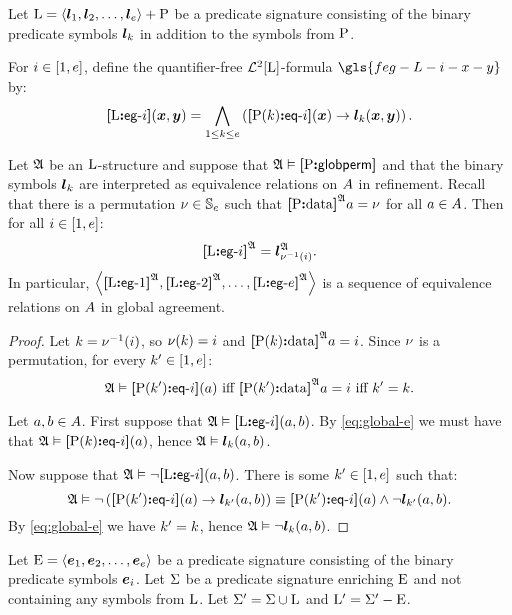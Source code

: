 Let ${\mathrm{L}} = \left\langle \bm{l}_{1}, \bm{l}_{2}, \dots, \bm{l}_{e} \right\rangle + {\mathrm{P}}$ be a predicate
signature consisting of the binary predicate symbols $\bm{l}_{k}$ in addition to
the symbols from ${\mathrm{P}}$.

\begin{definition}
For $i \in [1, e]$, define the quantifier-free $\mathcal{L}^{2}[{\mathrm{L}}]$-formula
$\gls{feg-L-i-x-y}$ by:
\[
  {\bm{[}{\mathrm{L}}\mathord{\bm{:}}\mathsf{eg}{\hbox{-}}i\bm{]}}(\bm{x},\bm{y}) = \bigwedge_{1 \leq k \leq e}
  \left({\bm{[}{\mathrm{P}}(k)\mathord{\bm{:}}\mathsf{eq}{\hbox{-}}i\bm{]}}(\bm{x}) \rightarrow \bm{l}_{k}(\bm{x}, \bm{y})\right).
\]
\end{definition}
\begin{remark}\label{rem:global-e-m}
Let $\mathfrak{A}$ be an ${\mathrm{L}}$-structure and suppose that 
$\mathfrak{A} \vDash {\bm{[}{\mathrm{P}}\mathord{\bm{:}}\mathsf{globperm}\bm{]}}$
and that the binary symbols $\bm{l}_{k}$ are interpreted as equivalence relations
on $A$ in refinement.
Recall that there is a permutation $\nu \in \mathbb{S}_{e}$ such that
${\bm{[}{\mathrm{P}}\mathord{\bm{:}}\mathrm{data}\bm{]}}^{\mathfrak{A}}a =\nu$ for all $a \in A$.
Then for all $i \in [1, e]$:
\[
  {\bm{[}{\mathrm{L}}\mathord{\bm{:}}\mathsf{eg}{\hbox{-}}i\bm{]}}^{\mathfrak{A}} = \bm{l}_{\nu^{-1}(i)}^{\mathfrak{A}}.
\]
In particular,
$\left\langle {\bm{[}{\mathrm{L}}\mathord{\bm{:}}\mathsf{eg}{\hbox{-}}1\bm{]}}^{\mathfrak{A}}, {\bm{[}{\mathrm{L}}\mathord{\bm{:}}\mathsf{eg}{\hbox{-}}2\bm{]}}^{\mathfrak{A}}, \dots, {\bm{[}{\mathrm{L}}\mathord{\bm{:}}\mathsf{eg}{\hbox{-}}e\bm{]}}^{\mathfrak{A}} \right\rangle$ is
a sequence of equivalence relations on $A$ in global agreement.
\end{remark}
\begin{proof}
Let $k = \nu^{-1}(i)$, so $\nu(k) = i$ and
${\bm{[}{\mathrm{P}}(k)\mathord{\bm{:}}\mathrm{data}\bm{]}}^{\mathfrak{A}}a = i$.
Since $\nu$ is a permutation, for every ${k'} \in [1, e]$:
\begin{equation}\label{eq:global-e}
\mifff{ 
  \StrA \vDash \feqA{\PS(\kkp)}\ii(\ea)}{
  \data{\PSp\kkp}\StrA\ea = \ii}{
  \kkp = \kk}.
\end{equation}

Let $a, b \in A$.
First suppose that $\mathfrak{A} \vDash {\bm{[}{\mathrm{L}}\mathord{\bm{:}}\mathsf{eg}{\hbox{-}}i\bm{]}}(a,b)$.
By \cref{eq:global-e} we must have that ${\mathfrak{A} \vDash
{\bm{[}{\mathrm{P}}(k)\mathord{\bm{:}}\mathsf{eq}{\hbox{-}}i\bm{]}}(a)}$, hence $\mathfrak{A} \vDash \bm{l}_{k}(a,b)$.

Now suppose that $\mathfrak{A} \vDash \lnot{\bm{[}{\mathrm{L}}\mathord{\bm{:}}\mathsf{eg}{\hbox{-}}i\bm{]}}(a,b)$. There is some
${k'} \in [1, e]$ such that:
\[
  \mathfrak{A} \vDash \lnot\left({\bm{[}{\mathrm{P}}({k'})\mathord{\bm{:}}\mathsf{eq}{\hbox{-}}i\bm{]}}(a) \rightarrow
  \bm{l}_{{k'}}(a,b)\right) \equiv {\bm{[}{\mathrm{P}}({k'})\mathord{\bm{:}}\mathsf{eq}{\hbox{-}}i\bm{]}}(a) \land
  \lnot\bm{l}_{{k'}}(a,b).
\]
By \cref{eq:global-e} we have ${k'} = k$, hence
$\mathfrak{A} \vDash \lnot\bm{l}_{k}(a,b)$.
\end{proof}

Let ${\mathrm{E}} = \left\langle \bm{e}_{1},\bm{e}_{2},\dots,\bm{e}_{e} \right\rangle$ be a predicate signature consisting
of the binary predicate symbols $\bm{e}_{i}$.
Let $\mathrm{\Sigma}$ be a predicate signature enriching ${\mathrm{E}}$ and not
containing any symbols from ${\mathrm{L}}$.
Let $\mathrm{\Sigma'} = \mathrm{\Sigma} \cup {\mathrm{L}}$ and
${{\mathrm{L}}'} = \mathrm{\Sigma'} - {\mathrm{E}}$.

